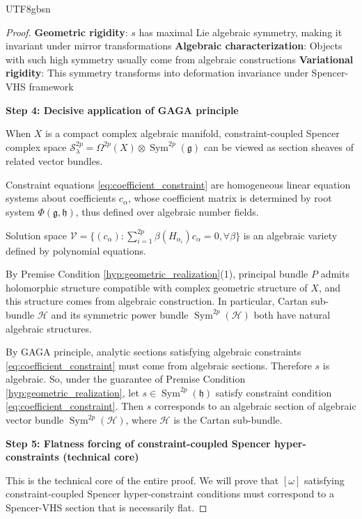 \documentclass[a4paper,12pt]{extarticle}
\theoremstyle{definition}
\begin{document}
\begin{CJK}{UTF8}{gbsn}
\begin{proof}
\textbf{Geometric rigidity}: $s$ has maximal Lie algebraic symmetry, making it invariant under mirror transformations
\textbf{Algebraic characterization}: Objects with such high symmetry usually come from algebraic constructions  
\textbf{Variational rigidity}: This symmetry transforms into deformation invariance under Spencer-VHS framework

\textbf{Step 4: Decisive application of GAGA principle}

When $X$ is a compact complex algebraic manifold, constraint-coupled Spencer complex space $\mathcal{S}^{2p}_\lambda = \Omega^{2p}(X) \otimes \operatorname{Sym}^{2p}(\mathfrak{g})$ can be viewed as section sheaves of related vector bundles.

Constraint equations \eqref{eq:coefficient_constraint} are homogeneous linear equation systems about coefficients $c_\alpha$, whose coefficient matrix is determined by root system $\Phi(\mathfrak{g}, \mathfrak{h})$, thus defined over algebraic number fields.

Solution space $\mathcal{V} = \{(c_\alpha) : \sum_{i=1}^{2p} \beta(H_{\alpha_i}) c_\alpha = 0, \forall \beta\}$ is an algebraic variety defined by polynomial equations.

By Premise Condition \ref{hyp:geometric_realization}(1), principal bundle $P$ admits holomorphic structure compatible with complex geometric structure of $X$, and this structure comes from algebraic construction. In particular, Cartan sub-bundle $\mathcal{H}$ and its symmetric power bundle $\operatorname{Sym}^{2p}(\mathcal{H})$ both have natural algebraic structures.

By GAGA principle, analytic sections satisfying algebraic constraints \eqref{eq:coefficient_constraint} must come from algebraic sections. Therefore $s$ is algebraic.
So, under the guarantee of Premise Condition \ref{hyp:geometric_realization}, let $s \in \operatorname{Sym}^{2p}(\mathfrak{h})$ satisfy constraint condition \eqref{eq:coefficient_constraint}. Then $s$ corresponds to an algebraic section of algebraic vector bundle $\operatorname{Sym}^{2p}(\mathcal{H})$, where $\mathcal{H}$ is the Cartan sub-bundle.

\textbf{Step 5: Flatness forcing of constraint-coupled Spencer hyper-constraints (technical core)}

This is the technical core of the entire proof. We will prove that $[\omega]$ satisfying constraint-coupled Spencer hyper-constraint conditions must correspond to a Spencer-VHS section that is necessarily flat.


\end{proof}
\end{CJK}
\end{document}
